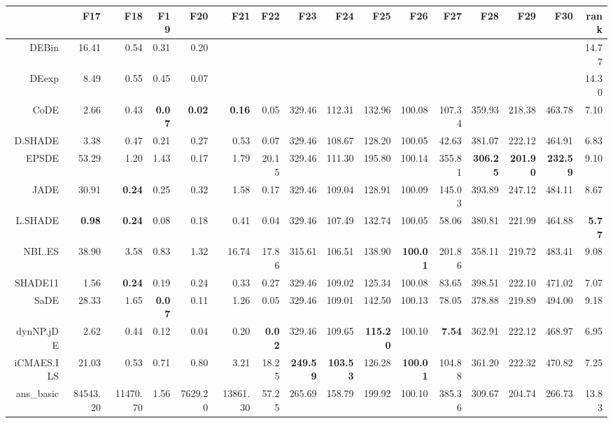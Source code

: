 \begin{table}[h!]
\centering
\begingroup\tiny
\begin{tabular}{rrrrrrrrrrrrrrrr}
  \hline
 & F17 & F18 & F19 & F20 & F21 & F22 & F23 & F24 & F25 & F26 & F27 & F28 & F29 & F30 & rank \\ 
  \hline
DEBin & 16.41 & 0.54 & 0.31 & 0.20 &  &  &  &  &  &  &  &  &  &  & 14.77 \\ 
  DEexp & 8.49 & 0.55 & 0.45 & 0.07 &  &  &  &  &  &  &  &  &  &  & 14.30 \\ 
  CoDE & 2.66 & 0.43 & \textbf{0.07} & \textbf{0.02} & \textbf{0.16} & 0.05 & 329.46 & 112.31 & 132.96 & 100.08 & 107.34 & 359.93 & 218.38 & 463.78 & 7.10 \\ 
  D.SHADE & 3.38 & 0.47 & 0.21 & 0.27 & 0.53 & 0.07 & 329.46 & 108.67 & 128.20 & 100.05 & 42.63 & 381.07 & 222.12 & 464.91 & 6.83 \\ 
  EPSDE & 53.29 & 1.20 & 1.43 & 0.17 & 1.79 & 20.15 & 329.46 & 111.30 & 195.80 & 100.14 & 355.81 & \textbf{306.25} & \textbf{201.90} & \textbf{232.59} & 9.10 \\ 
  JADE & 30.91 & \textbf{0.24} & 0.25 & 0.32 & 1.58 & 0.17 & 329.46 & 109.04 & 128.91 & 100.09 & 145.03 & 393.89 & 247.12 & 484.11 & 8.67 \\ 
  L.SHADE & \textbf{0.98} & \textbf{0.24} & 0.08 & 0.18 & 0.41 & 0.04 & 329.46 & 107.49 & 132.74 & 100.05 & 58.06 & 380.81 & 221.99 & 464.88 & \textbf{5.77} \\ 
  NBI..ES & 38.90 & 3.58 & 0.83 & 1.32 & 16.74 & 17.86 & 315.61 & 106.51 & 138.90 & \textbf{100.01} & 201.86 & 358.11 & 219.72 & 483.41 & 9.08 \\ 
  SHADE11 & 1.56 & \textbf{0.24} & 0.19 & 0.24 & 0.33 & 0.27 & 329.46 & 109.02 & 125.34 & 100.08 & 83.65 & 398.51 & 222.10 & 471.02 & 7.07 \\ 
  SaDE & 28.33 & 1.65 & \textbf{0.07} & 0.11 & 1.26 & 0.05 & 329.46 & 109.01 & 142.50 & 100.13 & 78.05 & 378.88 & 219.89 & 494.00 & 9.18 \\ 
  dynNP.jDE & 2.62 & 0.44 & 0.12 & 0.04 & 0.20 & \textbf{0.02} & 329.46 & 109.65 & \textbf{115.20} & 100.10 & \textbf{7.54} & 362.91 & 222.12 & 468.97 & 6.95 \\ 
  iCMAES.ILS & 21.03 & 0.53 & 0.71 & 0.80 & 3.21 & 18.25 & \textbf{249.59} & \textbf{103.53} & 126.28 & \textbf{100.01} & 104.88 & 361.20 & 222.32 & 470.82 & 7.25 \\ 
  ans\_basic & 84543.20 & 11470.70 & 1.56 & 7629.20 & 13861.30 & 57.25 & 265.69 & 158.79 & 199.92 & 100.10 & 385.36 & 309.67 & 204.74 & 266.73 & 13.83 \\ 

\end{tabular}
\end{table}
